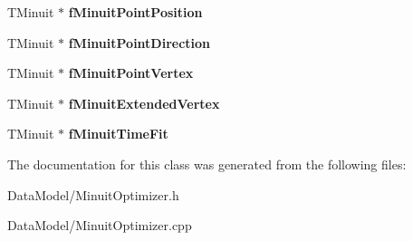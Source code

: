 \begin{DoxyCompactItemize}
\item 
\hypertarget{classMinuitOptimizer_ae9c9ea28e6e734256038f638a316dce2}{
TMinuit $\ast$ {\bfseries fMinuitPointPosition}}
\label{classMinuitOptimizer_ae9c9ea28e6e734256038f638a316dce2}

\item 
\hypertarget{classMinuitOptimizer_aaef0452e7c4311746d61a9576cdc8150}{
TMinuit $\ast$ {\bfseries fMinuitPointDirection}}
\label{classMinuitOptimizer_aaef0452e7c4311746d61a9576cdc8150}

\item 
\hypertarget{classMinuitOptimizer_a0b125bfd1ad8d29f7d54f5e2e260ed07}{
TMinuit $\ast$ {\bfseries fMinuitPointVertex}}
\label{classMinuitOptimizer_a0b125bfd1ad8d29f7d54f5e2e260ed07}

\item 
\hypertarget{classMinuitOptimizer_a89ca28d4d41d55eeeb71f3f34409d1aa}{
TMinuit $\ast$ {\bfseries fMinuitExtendedVertex}}
\label{classMinuitOptimizer_a89ca28d4d41d55eeeb71f3f34409d1aa}

\item 
\hypertarget{classMinuitOptimizer_a3c66ea05f5c285f977cefa51d872b2b8}{
TMinuit $\ast$ {\bfseries fMinuitTimeFit}}
\label{classMinuitOptimizer_a3c66ea05f5c285f977cefa51d872b2b8}

\end{DoxyCompactItemize}


The documentation for this class was generated from the following files:\begin{DoxyCompactItemize}
\item 
DataModel/MinuitOptimizer.h\item 
DataModel/MinuitOptimizer.cpp\end{DoxyCompactItemize}

